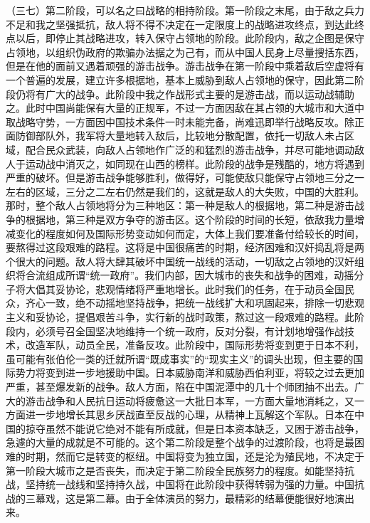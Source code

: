 （三七）第二阶段，可以名之曰战略的相持阶段。第一阶段之末尾，由于敌之兵力不足和我之坚强抵抗，敌人将不得不决定在一定限度上的战略进攻终点，到达此终点以后，即停止其战略进攻，转入保守占领地的阶段。此阶段内，敌之企图是保守占领地，以组织伪政府的欺骗办法据之为己有，而从中国人民身上尽量搜括东西，但是在他的面前又遇着顽强的游击战争。游击战争在第一阶段中乘着敌后空虚将有一个普遍的发展，建立许多根据地，基本上威胁到敌人占领地的保守，因此第二阶段仍将有广大的战争。此阶段中我之作战形式主要的是游击战，而以运动战辅助之。此时中国尚能保有大量的正规军，不过一方面因敌在其占领的大城市和大道中取战略守势，一方面因中国技术条件一时未能完备，尚难迅即举行战略反攻。除正面防御部队外，我军将大量地转入敌后，比较地分散配置，依托一切敌人未占区域，配合民众武装，向敌人占领地作广泛的和猛烈的游击战争，并尽可能地调动敌人于运动战中消灭之，如同现在山西的榜样。此阶段的战争是残酷的，地方将遇到严重的破坏。但是游击战争能够胜利，做得好，可能使敌只能保守占领地三分之一左右的区域，三分之二左右仍然是我们的，这就是敌人的大失败，中国的大胜利。那时，整个敌人占领地将分为三种地区：第一种是敌人的根据地，第二种是游击战争的根据地，第三种是双方争夺的游击区。这个阶段的时间的长短，依敌我力量增减变化的程度如何及国际形势变动如何而定，大体上我们要准备付给较长的时间，要熬得过这段艰难的路程。这将是中国很痛苦的时期，经济困难和汉奸捣乱将是两个很大的问题。敌人将大肆其破坏中国统一战线的活动，一切敌之占领地的汉奸组织将合流组成所谓“统一政府”。我们内部，因大城市的丧失和战争的困难，动摇分子将大倡其妥协论，悲观情绪将严重地增长。此时我们的任务，在于动员全国民众，齐心一致，绝不动摇地坚持战争，把统一战线扩大和巩固起来，排除一切悲观主义和妥协论，提倡艰苦斗争，实行新的战时政策，熬过这一段艰难的路程。此阶段内，必须号召全国坚决地维持一个统一政府，反对分裂，有计划地增强作战技术，改造军队，动员全民，准备反攻。此阶段中，国际形势将变到更于日本不利，虽可能有张伯伦一类的迁就所谓“既成事实”的“现实主义”的调头出现，但主要的国际势力将变到进一步地援助中国。日本威胁南洋和威胁西伯利亚，将较之过去更加严重，甚至爆发新的战争。敌人方面，陷在中国泥潭中的几十个师团抽不出去。广大的游击战争和人民抗日运动将疲惫这一大批日本军，一方面大量地消耗之，又一方面进一步地增长其思乡厌战直至反战的心理，从精神上瓦解这个军队。日本在中国的掠夺虽然不能说它绝对不能有所成就，但是日本资本缺乏，又困于游击战争，急遽的大量的成就是不可能的。这个第二阶段是整个战争的过渡阶段，也将是最困难的时期，然而它是转变的枢纽。中国将变为独立国，还是沦为殖民地，不决定于第一阶段大城市之是否丧失，而决定于第二阶段全民族努力的程度。如能坚持抗战，坚持统一战线和坚持持久战，中国将在此阶段中获得转弱为强的力量。中国抗战的三幕戏，这是第二幕。由于全体演员的努力，最精彩的结幕便能很好地演出来。

